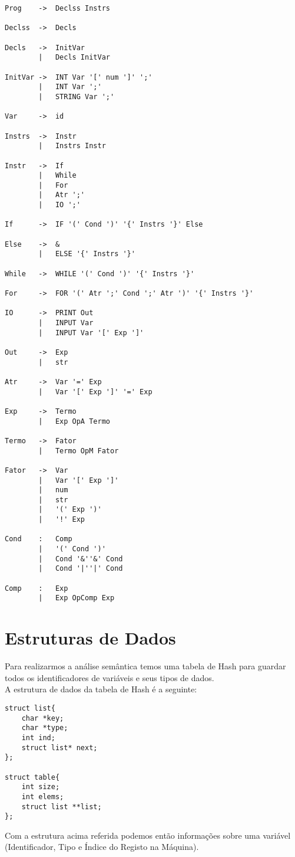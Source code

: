 \documentclass{report}
\begin{document}
\begin{verbatim}
Prog    ->  Declss Instrs

Declss  ->  Decls

Decls   ->  InitVar
        |   Decls InitVar

InitVar ->  INT Var '[' num ']' ';'
        |   INT Var ';'
        |   STRING Var ';'

Var     ->  id

Instrs  ->  Instr
        |   Instrs Instr

Instr   ->  If
        |   While
        |   For
        |   Atr ';'
        |   IO ';'

If      ->  IF '(' Cond ')' '{' Instrs '}' Else

Else    ->  &
        |   ELSE '{' Instrs '}'

While   ->  WHILE '(' Cond ')' '{' Instrs '}'

For     ->  FOR '(' Atr ';' Cond ';' Atr ')' '{' Instrs '}'

IO      ->  PRINT Out
        |   INPUT Var
        |   INPUT Var '[' Exp ']'

Out     ->  Exp
        |   str

Atr     ->  Var '=' Exp
        |   Var '[' Exp ']' '=' Exp

Exp     ->  Termo
        |   Exp OpA Termo

Termo   ->  Fator
        |   Termo OpM Fator

Fator   ->  Var
        |   Var '[' Exp ']'
        |   num
        |   str
        |   '(' Exp ')'
        |   '!' Exp

Cond    :   Comp
        |   '(' Cond ')'
        |   Cond '&''&' Cond
        |   Cond '|''|' Cond

Comp    :   Exp
        |   Exp OpComp Exp
\end{verbatim}

\section{Estruturas de Dados}
Para realizarmos a análise semântica temos uma tabela de Hash para guardar todos os identificadores de variáveis e seus tipos de dados. \\A estrutura de dados da tabela de Hash é a seguinte:\\
\begin{verbatim}
struct list{
    char *key;
    char *type;
    int ind;
    struct list* next;
};

struct table{
    int size;
    int elems;
    struct list **list;
};
\end{verbatim}
Com a estrutura acima referida podemos então informações sobre uma variável (Identificador, Tipo e Índice do Registo na Máquina).
\end{document}
